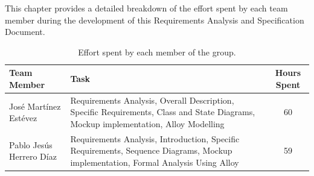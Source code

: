 This chapter provides a detailed breakdown of the effort spent by each team member during the development of this Requirements Analysis and Specification Document.

\begin{table}[H]
    \centering
    \begin{tabular}{|p{}|p{}|c|}
        \hline
        \textbf{Team Member} & \textbf{Task} & \textbf{Hours Spent} \\ 
        \hline
        José Martínez Estévez & Requirements Analysis, Overall Description, Specific Requirements, Class and State Diagrams, Mockup implementation, Alloy Modelling & 60 \\ 
        \hline
        Pablo Jesús Herrero Díaz & Requirements Analysis, Introduction, Specific Requirements, Sequence Diagrams, Mockup implementation, Formal Analysis Using Alloy & 59 \\ 
        \hline
    \end{tabular}
    \caption{Effort spent by each member of the group.}
    \label{tab:effort_spent}
\end{table}

